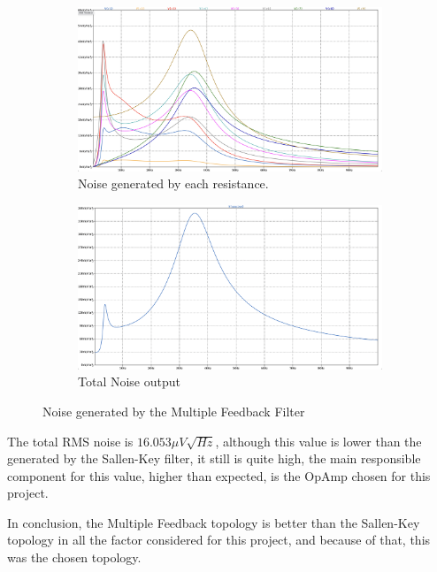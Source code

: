 \begin{figure}[H]
    \centering
    \begin{subfigure}{0.45\textwidth}
        \includegraphics*[width=\textwidth]{Images/NoiseResMFB.png}
        \caption{Noise generated by each resistance.}
        \label{fig:NoiseResMFB}  
    \end{subfigure}
    \begin{subfigure}{0.45\textwidth}
        \includegraphics*[width=\textwidth]{Images/NoiseTotalMFB.png}
        \caption{Total Noise output}
        \label{fig:NoiseTotalMFB}    
    \end{subfigure}
    \caption{Noise generated by the Multiple Feedback Filter}
    \label{fig:NoiseMFB}
\end{figure}

The total RMS noise is $16.053\mu V\sqrt{Hz}$, although this value is lower than the generated by the Sallen-Key filter, it still is quite high, the main responsible component for this value, higher than expected, is the OpAmp chosen for this project.

In conclusion, the Multiple Feedback topology is better than the Sallen-Key topology in all the factor considered for this project, and because of that, this was the chosen topology.

